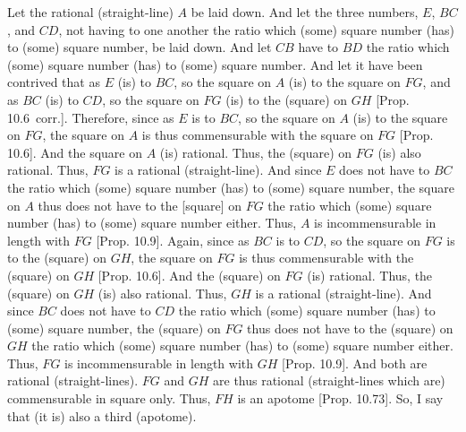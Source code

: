 \begin{Parallel}{}{}
{Let the rational (straight-line) $A$ be laid down. And let the
three numbers, $E$, $BC$, and $CD$, not having to one another
the ratio which (some) square number (has) to (some) square number,
be laid down. And let $CB$ have to $BD$ the ratio which (some)
square number (has) to (some) square number. And let it have been
contrived that as $E$ (is) to $BC$, so the square on $A$ (is) to the square
on $FG$, and as $BC$ (is) to $CD$, so the square on $FG$ (is) to the (square)
on $GH$ [Prop. 10.6~corr.]. Therefore,
since  as $E$ is to $BC$, so the square on $A$ (is) to the square on
$FG$, the square on $A$ is thus commensurable with the square on
$FG$ [Prop. 10.6]. And the square on $A$
(is) rational. Thus, the (square) on $FG$ (is) also rational. Thus,
$FG$ is a rational (straight-line). And since  $E$ does not have to $BC$
the ratio which (some) square number (has) to (some) square number,
the square on $A$ thus does not have to the [square] on $FG$ the ratio
which (some) square number (has) to (some) square number either. Thus,
$A$ is incommensurable in length with $FG$ [Prop. 10.9]. Again, since as $BC$ is to $CD$, so
the square on $FG$ is to the (square) on $GH$, the square on $FG$
is thus commensurable with the (square) on $GH$ [Prop. 10.6]. And the (square) on $FG$ (is)
rational. Thus, the (square) on $GH$ (is) also rational. Thus, $GH$ is
a rational (straight-line). And since $BC$ does not have to $CD$ the
ratio which (some) square number (has) to (some) square number, the
(square) on $FG$ thus does not have to the (square) on $GH$ the
ratio which (some) square number (has) to (some) square number either.
Thus, $FG$ is incommensurable in length with $GH$ [Prop. 10.9]. And both are rational (straight-lines).
$FG$ and $GH$ are thus rational (straight-lines which are) commensurable
in square only. Thus, $FH$ is an apotome [Prop. 10.73]. So, I say that (it is) also a third
(apotome).

}
\end{Parallel}
